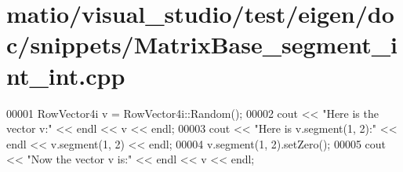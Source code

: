 \hypertarget{matio_2visual__studio_2test_2eigen_2doc_2snippets_2_matrix_base__segment__int__int_8cpp_source}{}\section{matio/visual\+\_\+studio/test/eigen/doc/snippets/\+Matrix\+Base\+\_\+segment\+\_\+int\+\_\+int.cpp}
\label{matio_2visual__studio_2test_2eigen_2doc_2snippets_2_matrix_base__segment__int__int_8cpp_source}

\begin{DoxyCode}
00001 RowVector4i v = RowVector4i::Random();
00002 cout << \textcolor{stringliteral}{"Here is the vector v:"} << endl << v << endl;
00003 cout << \textcolor{stringliteral}{"Here is v.segment(1, 2):"} << endl << v.segment(1, 2) << endl;
00004 v.segment(1, 2).setZero();
00005 cout << \textcolor{stringliteral}{"Now the vector v is:"} << endl << v << endl;
\end{DoxyCode}
